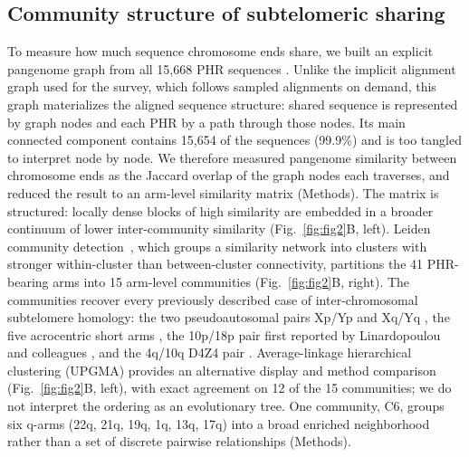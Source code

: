 \documentclass[pdflatex,mathphys]{jnl}
\begin{document}
\subsection*{Community structure of subtelomeric sharing}

To measure how much sequence chromosome ends share, we built an explicit
pangenome graph from all 15,668 PHR sequences
\cite{Garrison2024pggb,pangenome_graphs_unbiased_GarrisonGuarracino2023}. Unlike
the implicit alignment graph used for the survey, which follows sampled
alignments on demand, this graph materializes the aligned sequence structure:
shared sequence is represented by graph nodes and each PHR by a path through
those nodes. Its main connected component contains 15,654 of the sequences
(99.9\%) and is too tangled to interpret node by node.
We therefore measured pangenome similarity between chromosome ends as the Jaccard overlap of the graph nodes each traverses, and reduced the result to an arm-level similarity matrix (Methods).
The matrix is structured: locally dense blocks of high similarity are
embedded in a broader continuum of lower inter-community similarity
(Fig.~\ref{fig:fig2}B, left).
Leiden community detection~\cite{leiden_traag2019}, which groups a similarity
network into clusters with stronger within-cluster than between-cluster
connectivity, partitions the 41 PHR-bearing arms into 15 arm-level communities
(Fig.~\ref{fig:fig2}B, right).
The communities recover every previously described case of inter-chromosomal
subtelomere homology: the two pseudoautosomal pairs Xp/Yp and Xq/Yq
\cite{sexchrompars_acquaviva2020}, the five acrocentric short arms
\cite{acrocentric_Altemose2022}, the 10p/18p pair first reported by Linardopoulou
and colleagues \cite{Linardopoulou2005}, and the 4q/10q D4Z4 pair
\cite{dux4_d4z4_fshd_lemmers2010worldwide}.
Average-linkage hierarchical clustering (UPGMA) provides an alternative display and method comparison
(Fig.~\ref{fig:fig2}B, left), with exact agreement on 12 of the 15 communities;
we do not interpret the ordering as an evolutionary tree.
One community, C6, groups six q-arms (22q, 21q, 19q, 1q, 13q, 17q) into a broad enriched neighborhood rather than a set of discrete pairwise relationships (Methods).
\end{document}
